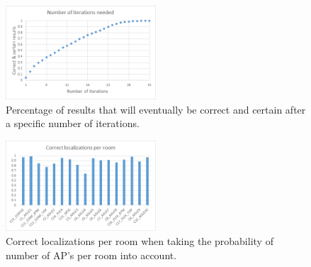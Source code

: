 \documentclass[a4paper,10pt,twoside]{IEEEtran}
\begin{document}
\begin{figure}[h!]
  \centering
    \includegraphics[width=0.5\textwidth]{iterations_needed}
    \caption{Percentage of results that will eventually be correct and certain after a specific number of iterations.}
    \label{fig:iterations-needed}
\end{figure}

\begin{figure}[h!]
  \centering
    \includegraphics[width=0.5\textwidth]{correctness_perroom}
    \caption{Correct localizations per room when taking the probability of number of AP's per room into account.}
    \label{fig:correctness-perroom}
\end{figure}
\end{document}
